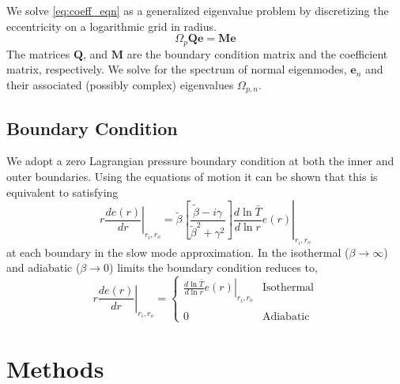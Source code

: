 \documentclass[apj]{emulateapj}
\begin{document}
We solve \eqref{eq:coeff_eqn} as a generalized eigenvalue problem by discretizing the eccentricity on a logarithmic grid in radius. 
\begin{equation}
\Omega_p \mathbf{Q} \mathbf{e} = \mathbf{M} \mathbf{e}
\end{equation}
The matrices $\mathbf{Q}$, and $\mathbf{M}$ are the boundary condition matrix and the coefficient matrix, respectively. We solve for the spectrum of normal eigenmodes, $\mathbf{e}_n$ and their associated (possibly complex) eigenvalues $\Omega_{p,n}$. 








\subsection{Boundary Condition} 
We adopt a zero Lagrangian pressure boundary condition at both the inner and outer boundaries. Using the equations of motion it can be shown that this is equivalent to satisfying 
\begin{equation}
\left. r \frac{d e(r) }{d r}\right|_{r_i, r_o} = \left. \tilde{\beta} \left[ \frac{ \tilde{\beta} - i \gamma }{ \tilde{\beta}^2 + \gamma^2 } \right] \frac{d \ln \bar{T}}{d \ln r } e(r) \right|_{r_i, r_o}
\end{equation}
at each boundary in the slow mode approximation. In the isothermal ($\beta \rightarrow \infty$) and adiabatic ($\beta \rightarrow 0$) limits the boundary condition reduces to,
\begin{equation}
\left. r \frac{d e(r)}{d r} \right|_{r_i, r_o} = 
\begin{cases}
\left. \frac{d \ln \bar{T}}{d \ln r} e(r) \right|_{r_i,r_o}  & \text{Isothermal} \\ \\ 
0 & \text{Adiabatic}
\end{cases}
\end{equation}


\section{Methods}
\end{document}
